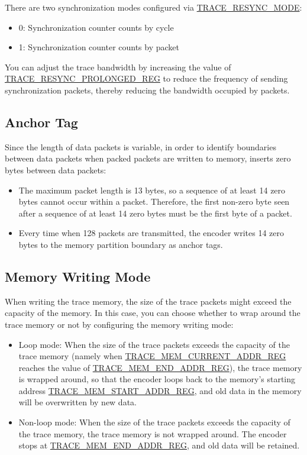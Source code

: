 \documentclass[main\_\_EN.tex]{subfiles}
\begin{document}
There are two synchronization modes configured via \hyperref[fielddesc:TRACERESYNCMODE]{TRACE\_RESYNC\_MODE}:
\begin{itemize}
    \item 0: Synchronization counter counts by cycle
    \item 1: Synchronization counter counts by packet
\end{itemize}

You can adjust the trace bandwidth by increasing the value of \hyperref[regdesc:TRACERESYNCPROLONGEDREG]{TRACE\_RESYNC\_PROLONGED\_REG} to reduce the frequency of sending synchronization packets, thereby reducing the bandwidth occupied by packets.

\subsection{Anchor Tag}

Since the length of data packets is variable, in order to identify boundaries between data packets when packed packets are written to memory, \chipname{} inserts zero bytes between data packets:
\begin{itemize}
    \item The maximum packet length is 13 bytes, so a sequence of at least 14 zero bytes cannot occur within a packet. Therefore, the first non-zero byte seen after a sequence of at least 14 zero bytes must be the first byte of a packet.
    \item Every time when 128 packets are transmitted, the encoder writes 14 zero bytes to the memory partition boundary as anchor tags.
\end{itemize}

\subsection{Memory Writing Mode}

When writing the trace memory, the size of the trace packets might exceed the capacity of the memory. In this case, you can choose whether to wrap around the trace memory or not by configuring the memory writing mode:

\begin{itemize}
    \item Loop mode: When the size of the trace packets exceeds the capacity of the trace memory (namely when \hyperref[regdesc:TRACEMEMCURRENTADDRREG]{TRACE\_MEM\_CURRENT\_ADDR\_REG} reaches the value of \hyperref[regdesc:TRACEMEMENDADDRREG]{TRACE\_MEM\_END\_ADDR\_REG}), the trace memory is wrapped around, so that the encoder loops back to the memory's starting address \hyperref[regdesc:TRACEMEMSTARTADDRREG]{TRACE\_MEM\_START\_ADDR\_REG}, and old data in the memory will be overwritten by new data.
    \item Non-loop mode: When the size of the trace packets exceeds the capacity of the trace memory, the trace memory is not wrapped around. The encoder stops at \hyperref[regdesc:TRACEMEMENDADDRREG]{TRACE\_MEM\_END\_ADDR\_REG}, and old data will be retained.
\end{itemize}
\end{document}
